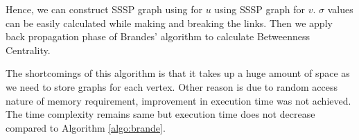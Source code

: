 Hence, we can construct SSSP graph using for $u$ using SSSP graph for $v$.
$\sigma$ values can be easily calculated while making and breaking the links. Then we apply back propagation phase of Brandes' algorithm to calculate Betweenness Centrality. 

The shortcomings of this algorithm is that it takes up a huge amount of space as we need to store graphs for each vertex. Other reason is due to random access nature of memory requirement, improvement in execution time was not achieved. The time complexity remains same but execution time does not decrease compared to Algorithm \ref{algo:brande}.






